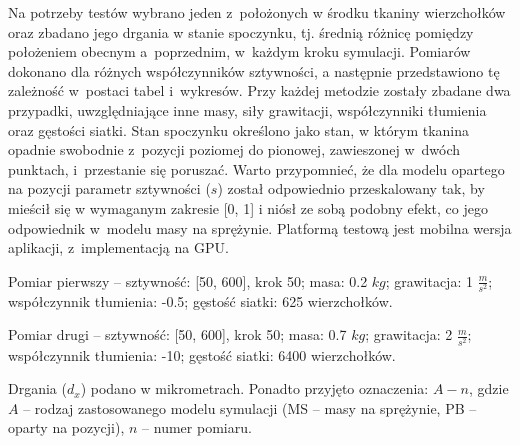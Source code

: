 		Na potrzeby testów wybrano jeden z~położonych w środku tkaniny wierzchołków oraz zbadano jego drgania w stanie spoczynku, tj. średnią różnicę pomiędzy położeniem obecnym a~poprzednim, w~każdym kroku symulacji. Pomiarów dokonano dla różnych współczynników sztywności, a następnie przedstawiono tę zależność w~postaci tabel i~wykresów. Przy każdej metodzie zostały zbadane dwa przypadki, uwzględniające inne masy, siły grawitacji, współczynniki tłumienia oraz gęstości siatki. Stan spoczynku określono jako stan, w którym tkanina opadnie swobodnie z~pozycji poziomej do pionowej, zawieszonej w~dwóch punktach, i~przestanie się poruszać. Warto przypomnieć, że dla modelu opartego na pozycji parametr sztywności (\(s\)) został odpowiednio przeskalowany tak, by mieścił się w wymaganym zakresie [0, 1] i niósł ze sobą podobny efekt, co jego odpowiednik w~modelu masy na sprężynie. Platformą testową jest mobilna wersja aplikacji, z~implementacją na GPU.
		
		Pomiar pierwszy -- sztywność: [50, 600], krok 50; masa: 0.2 \(kg\); grawitacja: 1 \(\frac{m}{s^2}\); współczynnik tłumienia: -0.5; gęstość siatki: 625 wierzchołków.
		
		Pomiar drugi -- sztywność: [50, 600], krok 50; masa: 0.7 \(kg\); grawitacja: 2 \(\frac{m}{s^2}\); współczynnik tłumienia: -10; gęstość siatki: 6400 wierzchołków.
		
		Drgania (\(d_{x}\)) podano w mikrometrach. Ponadto przyjęto oznaczenia: \(A-n\), gdzie \(A\) -- rodzaj zastosowanego modelu symulacji (MS -- masy na sprężynie, PB -- oparty na pozycji), \(n\) -- numer pomiaru.
		\newline
		
		
		\pagebreak
		
